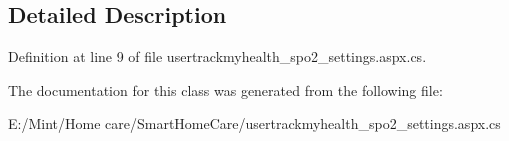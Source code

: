\subsection{Detailed Description}


Definition at line 9 of file usertrackmyhealth\-\_\-spo2\-\_\-settings.\-aspx.\-cs.



The documentation for this class was generated from the following file\-:\begin{DoxyCompactItemize}
\item 
E\-:/\-Mint/\-Home care/\-Smart\-Home\-Care/usertrackmyhealth\-\_\-spo2\-\_\-settings.\-aspx.\-cs\end{DoxyCompactItemize}
